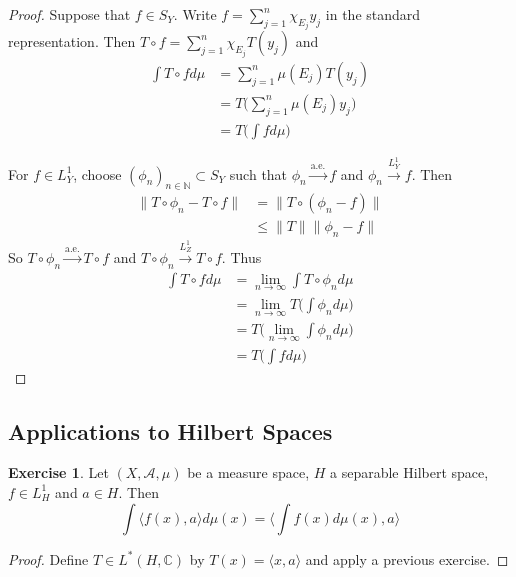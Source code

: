 \documentclass[12pt]{amsart}
\theoremstyle{definition}
\newtheorem{ex}[definition]{Exercise}
\newcommand{\C}{\mathbb{C}}
\newcommand{\N}{\mathbb{N}}
\newcommand{\MA}{\mathcal{A}}
\renewcommand{\r}{\rangle}
\renewcommand{\l}{\langle}
\newcommand{\limn}{\lim \limits_{n \rightarrow \infty}}
\newcommand{\convt}[1]{\xrightarrow{\text{#1}}}
\newcommand{\conv}[1]{\xrightarrow{#1}}
\newcommand{\lex}[1]{\label{ex:#1}}
\begin{document}
	\begin{proof}
	Suppose that $f \in S_Y$. Write $f = \sum\limits_{j=1}^n \chi_{E_j}y_j $ in the standard representation. Then $T \circ f = \sum\limits_{j=1}^n \chi_{E_j}T(y_j)$  and 
	\begin{align*}
	\int T \circ f d \mu 
	&= \sum\limits_{j=1}^n \mu(E_j)T(y_j) \\
	&= T \bigg(\sum\limits_{j=1}^n \mu(E_j)y_j \bigg) \\
	&= T \bigg( \int f d\mu \bigg)
	\end{align*}
	
	For $f \in L^1_Y$, choose $(\phi_n)_{n \in \N} \subset S_Y$ such that $\phi_n \convt{a.e.} f$ and $\phi_n \conv{L^1_Y} f$. Then 
	\begin{align*}
	\|T \circ \phi_n - T \circ f\| 
	&= \|T \circ (\phi_n - f)\| \\
	& \leq \|T\| \|\phi_n - f\|
	\end{align*}
	So $T \circ \phi_n \convt{a.e.} T \circ f$ and $T \circ \phi_n \conv{L^1_Z} T \circ f $. Thus 
	\begin{align*}
	\int T \circ f d\mu 
	&= \limn \int T \circ \phi_n d\mu \\
	&= \limn T \bigg( \int \phi_n d\mu \bigg) \\
	&= T \bigg( \limn \int \phi_n d\mu \bigg) \\
	&= T \bigg( \int f d\mu  \bigg)
	\end{align*}
	\end{proof}
	
	
	
	
	
	
	
	
	
	
	
	
	
	
	
	
	
	
	\newpage
	\subsection{Applications to Hilbert Spaces}	
	
	\begin{ex} \lex{00000} 
	Let $(X, \MA, \mu)$ be a measure space, $H$ a separable Hilbert space, $f \in L^1_H$ and $a \in H$. Then $$\int \l f(x), a \r d\mu(x) = \bigg \l \int f(x) d \mu(x) , a\bigg \r$$ 
	\end{ex}	
	
	\begin{proof}
	Define $T \in L^*(H, \C)$ by $T(x) = \l x, a \r$ and apply a previous exercise.
	\end{proof}
	
\end{document}
